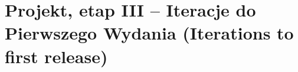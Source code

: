 \chapter{Projekt, etap III -- Iteracje do Pierwszego Wydania (Iterations to first release)}
\label{cha:EtapIII}

\newpage
